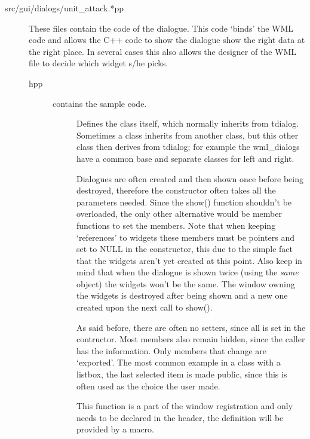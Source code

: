 \begin{description}

\item[src/gui/dialogs/unit\_attack.*pp]
	These files contain the code of the dialogue. This code `binds' the WML
	code and allows the C++ code to show the dialogue show the right data at the
	right place. In several cases this also allows the designer of the WML file
	to decide which widget s/he picks.

\begin{description}
\item[hpp]  contains the sample code. 
	\begin{description}
	\item[]
		Defines the class itself, which normally inherits from tdialog.
		Sometimes a class inherits from another class, but this other class then
derives from tdialog; for example the wml\_dialogs have a common base and
separate classes for left and right.

	\item[]
		Dialogues are often created and then shown once before being destroyed,
therefore the constructor often takes all the parameters needed. Since the show()
function shouldn't be overloaded, the only other alternative would be member
functions to set the members. Note that when keeping `references' to widgets these
members must be pointers and set to NULL in the constructor, this due to the
simple fact that the widgets aren't yet created at this point. Also keep in mind that
when the dialogue is shown twice (using the \emph{same} object) the widgets won't be
the same. The window owning the widgets is destroyed after being shown and
a new one created upon the next call to show().

	\item[]
		As said before, there are often no setters, since all is set in the
contructor. Most members also remain hidden, since the caller has the
information. Only members that change are `exported'. The most common example in
a class with a listbox, the last selected item is made public, since this is
often used as the choice the user made.

	\item[]
		This function is a part of the window registration and only needs to be
declared in the header, the definition will be provided by a macro.


\end{description}
\end{description}
\end{description}
